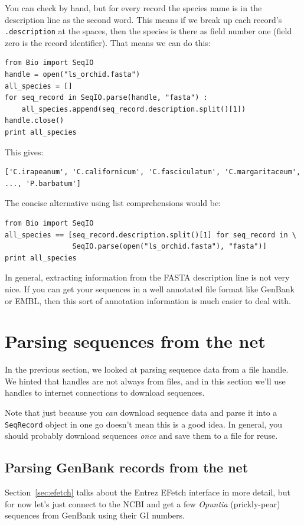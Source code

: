 \documentclass{report}
\begin{document}
You can check by hand, but for every record the species name is in the description line as the second word.  This means if we break up each record's \verb|.description| at the spaces, then the species is there as field number one (field zero is the record identifier).  That means we can do this:

\begin{verbatim}
from Bio import SeqIO
handle = open("ls_orchid.fasta")
all_species = []
for seq_record in SeqIO.parse(handle, "fasta") :
    all_species.append(seq_record.description.split()[1])
handle.close()
print all_species
\end{verbatim}

\noindent This gives:

\begin{verbatim}
['C.irapeanum', 'C.californicum', 'C.fasciculatum', 'C.margaritaceum', ..., 'P.barbatum']
\end{verbatim}

The concise alternative using list comprehensions would be:

\begin{verbatim}
from Bio import SeqIO
all_species == [seq_record.description.split()[1] for seq_record in \
                SeqIO.parse(open("ls_orchid.fasta"), "fasta")]
print all_species
\end{verbatim}

In general, extracting information from the FASTA description line is not very nice.
If you can get your sequences in a well annotated file format like GenBank or EMBL,
then this sort of annotation information is much easier to deal with.

\section{Parsing sequences from the net}
\label{sec:SeqIO_Online}
In the previous section, we looked at parsing sequence data from a file handle.
We hinted that handles are not always from files, and in this section we'll use
handles to internet connections to download sequences.

Note that just because you \emph{can} download sequence data and parse it into
a \verb|SeqRecord| object in one go doesn't mean this is a good idea.
In general, you should probably download sequences \emph{once} and save them to
a file for reuse.

\subsection{Parsing GenBank records from the net}
\label{sec:SeqIO_GenBank_Online}
Section~\ref{sec:efetch} talks about the Entrez EFetch interface in more detail,
but for now let's just connect to the NCBI and get a few \textit{Opuntia} (prickly-pear)
sequences from GenBank using their GI numbers.
\end{document}

